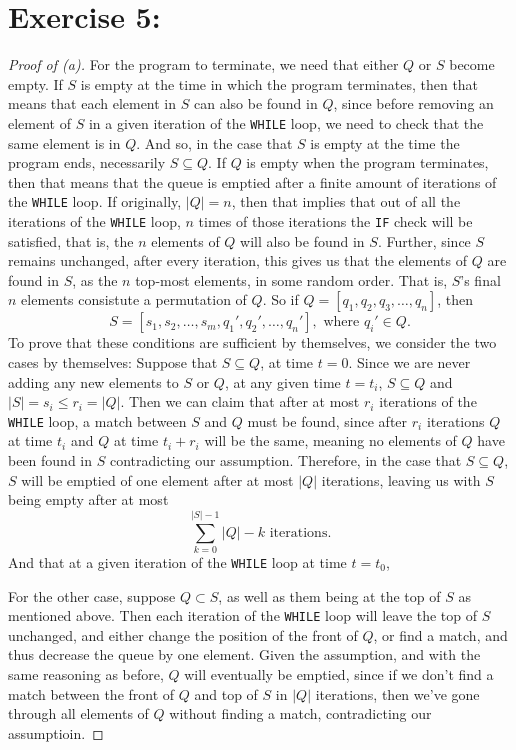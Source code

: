 \documentclass{article}
\begin{document}
\section*{Exercise 5:}
\begin{proof}[Proof of (a)]
For the program to terminate, we need that either $Q$ or $S$ become empty. 
If $S$ is empty at the time in which the program terminates,
then that means that each element in $S$ can also be found in $Q$, since before
removing an element of $S$ in a given iteration of the \texttt{WHILE} loop, 
we need to check that the same element is in $Q$. And so, in the case that $S$ is empty at
the time the program ends, necessarily $S \subseteq Q$. \bigskip \newline
If $Q$ is empty when the program terminates, then that means that the queue is emptied after a 
finite amount of iterations of the \texttt{WHILE} loop. If originally, $\left|Q\right|= n$,
then that implies that out of all the iterations of the \texttt{WHILE} loop, 
$n$ times of those iterations the \texttt{IF} check will be satisfied, that is, the  $n$
elements of $Q$ will also be found in $S$. Further, since  $S$ remains unchanged, after every
iteration, this gives us that the elements of $Q$ are found in $S$, as the $n$
top-most elements, in some random order. That is, $S$'s final $n$ elements consistute a permutation
of $Q$. So if $Q = [q_1,q_2,q_3 ,\ldots, q_{n}]$, then  \[
S = [s_1,s_2, \ldots, s_{m}, q_1' , q_2', \ldots, q_{n}'], \text{ where } q_{i}' \in Q.
\] To prove that these conditions are sufficient by themselves, we consider the two cases by 
themselves:
Suppose that $S \subseteq Q$, at time $t=0$. Since we are never adding any new elements to $S$ or
$Q$, at any given time $t= t_i$, $S \subseteq Q$ and $\left|S\right| = s_{i} \leq r_{i} = 
\left|Q\right|$. Then we can claim that after at most $r_i$ iterations of the \texttt{WHILE}
loop, a match between $S$ and $Q$ must be found, since after $r_i$ iterations $Q$ at time $t_i$ 
and $Q$ at time $t_i + r_i$ will be the same, meaning no elements of $Q$ have been found in $S$ 
contradicting our assumption. Therefore, in the case that $S \subseteq Q$, $S$ will be emptied of
one element after at most $\left|Q\right|$ iterations, leaving us with $S$ being empty after at 
most 
\begin{equation}
\sum\limits_{k= 0}^{\left|S\right| - 1} \left|Q \right| - k \text{ iterations.}
\end{equation}
And that at a given iteration of the \texttt{WHILE} 
loop at time $t =t_0$,

For the other case, suppose $Q \subset  S$, as well as them being at the top of $S$ as mentioned 
above. Then each iteration of the \texttt{WHILE} loop will leave the top of $S$ unchanged, and
either change the position of the front of $Q$, or find a match, and thus decrease the queue by 
one element. Given the assumption, and with the same reasoning as before, $Q$ will eventually
be emptied, since if we don't find a match between the front of $Q$ and top of $S$ in  
$\left|Q\right|$ iterations, then we've gone through all elements of $Q$ without finding a match,
contradicting our assumptioin. 
\end{proof}
\end{document}
